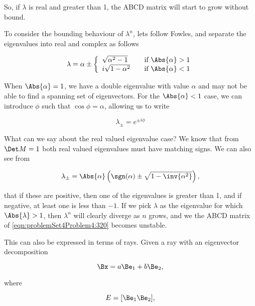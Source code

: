 {So, if $\lambda$ is real and greater than 1, the ABCD matrix will start to grow without bound.

To consider the bounding behaviour of $\lambda^n$, lets follow Fowles, and separate the eigenvalues into real and complex as follows

\begin{dmath}\label{eqn:problemSet4Problem4:180}
\lambda = \alpha \pm 
\left\{
\begin{array}{l l}
\sqrt{\alpha^2 - 1} & \quad \mbox{if $\Abs{\alpha} > 1$} \\
i \sqrt{1 - \alpha^2} & \quad \mbox{if $\Abs{\alpha} < 1$} 
\end{array}
\right.
\end{dmath}

When $\Abs{\alpha} = 1$, we have a double eigenvalue with value $\alpha$ and may not be able to find a spanning set of eigenvectors.  For the $\Abs{\alpha} < 1$ case, we can introduce $\phi$ such that $\cos\phi = \alpha$, allowing us to write

\begin{dmath}\label{eqn:problemSet4Problem4:200}
\lambda_{\pm} = e^{\pm i \phi}
\end{dmath}

What can we say about the real valued eigenvalue case?  We know that from $\Det M = 1$ both real valued eigenvalues must have matching signs.  We can also see from

\begin{dmath}\label{eqn:problemSet4Problem4:240}
\lambda_{\pm} = \Abs{\alpha} \left( \sgn(\alpha) \pm \sqrt{1 - \inv{\alpha^2}} \right),
\end{dmath}

that if these are positive, then one of the eigenvalues is greater than 1, and if negative, at least one is less than $-1$.  If we pick $\lambda$ as the eigenvalue for which $\Abs{\lambda} > 1$, then $\lambda^n$ will clearly diverge as $n$ grows, and we the ABCD matrix of \ref{eqn:problemSet4Problem4:320} becomes unstable.

This can also be expressed in terms of rays.  Given a ray with an eigenvector decomposition

\begin{dmath}\label{eqn:problemSet4Problem4:340}
\Bx = a \Be_1 + b \Be_2,
\end{dmath}

where

\begin{dmath}\label{eqn:problemSet4Problem4:360}
E = [ \Be_1 \Be_2 ],
\end{dmath}

}
